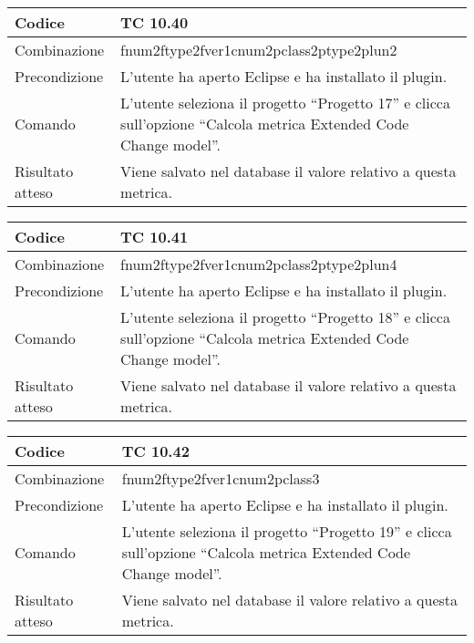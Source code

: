 \begin{table}[ht]
\begin{tabular}{|p{3cm}|p{9cm}|}
\hline
\cellcolor{lightgray}Codice				& TC 10.40								\\
\hline
\cellcolor{lightgray}Combinazione		& fnum2ftype2fver1cnum2pclass2ptype2plun2									\\
\hline
\cellcolor{lightgray}Precondizione		& L'utente ha aperto Eclipse e ha installato il plugin.		\\
\hline
\cellcolor{lightgray}Comando			& L'utente seleziona il progetto ``Progetto 17''  e clicca sull'opzione ``Calcola metrica Extended Code Change model''.	\\
\hline
\cellcolor{lightgray}Risultato atteso	& Viene salvato nel database il valore relativo a questa metrica.\\
\hline
\end{tabular}
\end{table}

\begin{table}[ht]
\begin{tabular}{|p{3cm}|p{9cm}|}
\hline
\cellcolor{lightgray}Codice				& TC 10.41								\\
\hline
\cellcolor{lightgray}Combinazione		& fnum2ftype2fver1cnum2pclass2ptype2plun4									\\
\hline
\cellcolor{lightgray}Precondizione		& L'utente ha aperto Eclipse e ha installato il plugin.		\\
\hline
\cellcolor{lightgray}Comando			& L'utente seleziona il progetto ``Progetto 18''  e clicca sull'opzione ``Calcola metrica Extended Code Change model''.	\\
\hline
\cellcolor{lightgray}Risultato atteso	& Viene salvato nel database il valore relativo a questa metrica.\\
\hline
\end{tabular}
\end{table}

\begin{table}[ht]
\begin{tabular}{|p{3cm}|p{9cm}|}
\hline
\cellcolor{lightgray}Codice				& TC 10.42								\\
\hline
\cellcolor{lightgray}Combinazione		& fnum2ftype2fver1cnum2pclass3									\\
\hline
\cellcolor{lightgray}Precondizione		& L'utente ha aperto Eclipse e ha installato il plugin.		\\
\hline
\cellcolor{lightgray}Comando			& L'utente seleziona il progetto ``Progetto 19''  e clicca sull'opzione ``Calcola metrica Extended Code Change model''.	\\
\hline
\cellcolor{lightgray}Risultato atteso	& Viene salvato nel database il valore relativo a questa metrica.\\
\hline
\end{tabular}
\end{table}

